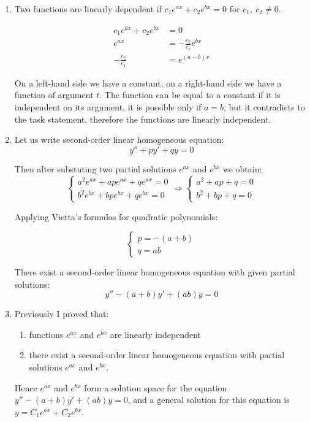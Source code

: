 \begin{enumerate}[label=\alph*]
    \item Two functions are linearly dependent if $c_1 e^{ax} + c_2 e^{bx} = 0$ for $c_1,\ c_2 \neq 0$.

        \begin{displaymath}
            \begin{aligned}
                c_1 e^{ax} + c_2 e^{bx} & = 0 \\
                e^{ax} & = -\frac{c_2}{c_1}e^{bx} \\
                -\frac{c_2}{c_1} & = e^{(a - b)x}
            \end{aligned}
        \end{displaymath}

        On a left-hand side we have a constant, on a right-hand side we have a function of argument $t$. The function can be equal to a constant if it is independent on its argument, it is possible only if $a = b$, but it contradicts to the task statement, therefore the functions are linearly independent.
    
    \item Let us write second-order linear homogeneous equation:
        $$y'' + p y' + qy = 0$$

        Then after substuting two partial solutions $e^{ax}$ and $e^{bx}$ we obtain:
        $$\begin{cases}
            a^2 e^{ax} + ap e^{ax} + qe^{ax} = 0 \\
            b^2 e^{bx} + bp e^{bx} + qe^{bx} = 0
        \end{cases}
        \Longrightarrow 
        \begin{cases}
            a^2 + ap + q = 0 \\
            b^2 + bp + q = 0
        \end{cases}$$

        Applying Vietta's formulas for quadratic polynomials:

        $$\begin{cases}
            p = -(a + b) \\
            q = ab
        \end{cases}$$

        There exist a second-order linear homogeneous equation with given partial solutions:
        $$y'' - (a + b)y' + (ab)y = 0$$
    
    \item Previously I proved that:
        \begin{enumerate}
            \item functions $e^{ax}$ and $e^{bx}$ are linearly independent
            \item there exist a second-order linear homogeneous equation with partial solutions $e^{ax}$ and $e^{bx}$.
        \end{enumerate}

        Hence $e^{ax}$ and $e^{bx}$ form a solution space for the equation $y'' - (a + b)y' + (ab)y = 0$, and a general solution for this equation is $y = C_1 e^{ax} + C_2 e^{bx}$.
\end{enumerate}

